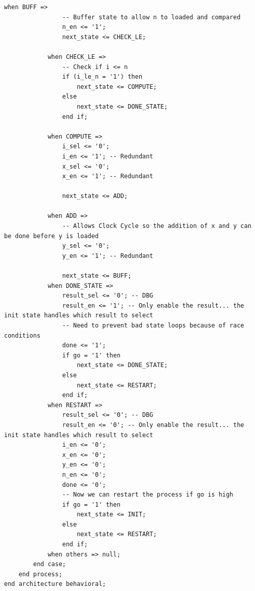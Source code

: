 \documentclass{article}
\begin{document}
\begin{lstlisting}[caption=Two Process FSM VHDL Code, label=lst:two-process-fsm-vhdl-code]
            when BUFF =>
                -- Buffer state to allow n to loaded and compared
                n_en <= '1';
                next_state <= CHECK_LE;

            when CHECK_LE =>
                -- Check if i <= n
                if (i_le_n = '1') then
                    next_state <= COMPUTE;
                else
                    next_state <= DONE_STATE;
                end if;
            
            when COMPUTE =>
                i_sel <= '0';
                i_en <= '1'; -- Redundant
                x_sel <= '0';
                x_en <= '1'; -- Redundant

                next_state <= ADD;

            when ADD =>
                -- Allows Clock Cycle so the addition of x and y can be done before y is loaded
                y_sel <= '0';
                y_en <= '1'; -- Redundant

                next_state <= BUFF;
            when DONE_STATE =>
                result_sel <= '0'; -- DBG 
                result_en <= '1'; -- Only enable the result... the init state handles which result to select
                -- Need to prevent bad state loops because of race conditions
                done <= '1';
                if go = '1' then
                    next_state <= DONE_STATE;
                else
                    next_state <= RESTART;
                end if;
            when RESTART =>
                result_sel <= '0'; -- DBG 
                result_en <= '0'; -- Only enable the result... the init state handles which result to select
                i_en <= '0';
                x_en <= '0';
                y_en <= '0';
                n_en <= '0';
                done <= '0';
                -- Now we can restart the process if go is high
                if go = '1' then
                    next_state <= INIT;
                else
                    next_state <= RESTART;
                end if;
            when others => null;
        end case;
    end process;
end architecture behavioral;
\end{lstlisting}
\end{document}
